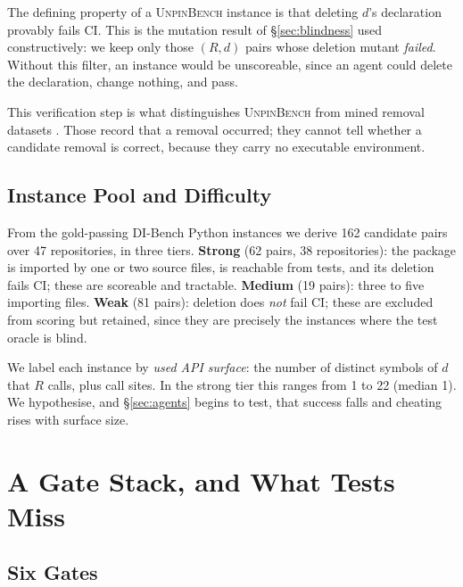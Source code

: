 \documentclass[11pt]{article}
\newif\ifdraft
\newcommand{\todo}[1]{\ifdraft\textcolor{red}{\textbf{[TODO: #1]}}\fi}
\newcommand{\bench}{\textsc{UnpinBench}}
\newcommand{\dibench}{DI-Bench}
\begin{document}
The defining property of a \bench{} instance is that deleting $d$'s declaration provably fails CI.
This is the mutation result of \S\ref{sec:blindness} used constructively: we keep only those $(R,d)$ pairs whose deletion mutant \emph{failed}.
Without this filter, an instance would be unscoreable, since an agent could delete the declaration, change nothing, and pass.

This verification step is what distinguishes \bench{} from mined removal datasets \citep{jaisri2024dataset,he2021migration}.
Those record that a removal occurred; they cannot tell whether a candidate removal is correct, because they carry no executable environment.

\subsection{Instance Pool and Difficulty}

From the gold-passing \dibench{} Python instances we derive 162 candidate pairs over 47 repositories, in three tiers.
\textbf{Strong} (62 pairs, 38 repositories): the package is imported by one or two source files, is reachable from tests, and its deletion fails CI; these are scoreable and tractable.
\textbf{Medium} (19 pairs): three to five importing files.
\textbf{Weak} (81 pairs): deletion does \emph{not} fail CI; these are excluded from scoring but retained, since they are precisely the instances where the test oracle is blind.

We label each instance by \emph{used API surface}: the number of distinct symbols of $d$ that $R$ calls, plus call sites.
In the strong tier this ranges from 1 to 22 (median 1).
We hypothesise, and \S\ref{sec:agents} begins to test, that success falls and cheating rises with surface size.

\todo{full run: extend the pool by mining removal commits (repositories cloned with full history) for human reference solutions, and extend to \dibench's \emph{large} subset (50 further Python repositories).}

\section{A Gate Stack, and What Tests Miss}
\label{sec:gates}

\subsection{Six Gates}
\end{document}
